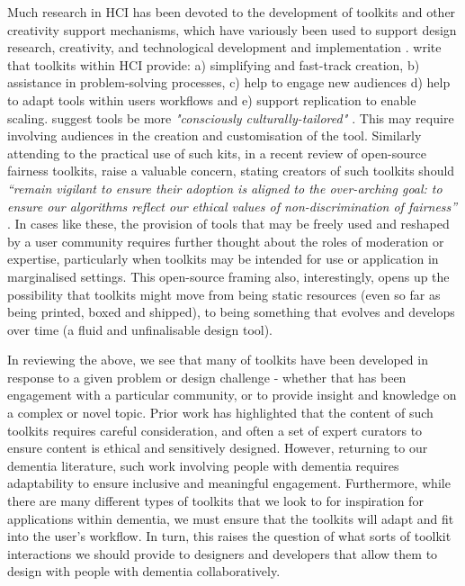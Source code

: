 Much research in HCI has been devoted to the development of toolkits and other creativity support mechanisms, which have variously been used to support design research, creativity, and technological development and implementation \citep{broderick2020theory}. \cite{ledo2018evaluation} write that toolkits within HCI provide: a) simplifying and fast-track creation, b) assistance in problem-solving processes, c) help to engage new audiences d) help to adapt tools within users workflows and e) support replication to enable scaling. \cite{peters2020toolkits} suggest tools be more \textit{"consciously culturally-tailored" \citep[pg.20]{peters2020toolkits}}. This may require involving audiences in the creation and customisation of the tool. Similarly attending to the practical use of such kits, in a recent review of open-source fairness toolkits, \cite{lee2021landscape} raise a valuable concern, stating creators of such toolkits should \textit{“remain vigilant to ensure their adoption is aligned to the over-arching goal: to ensure our algorithms reflect our ethical values of non-discrimination of fairness” \citep[pg.12]{lee2021landscape}}. In cases like these, the provision of tools that may be freely used and reshaped by a user community requires further thought about the roles of moderation or expertise, particularly when toolkits may be intended for use or application in marginalised settings. This open-source framing also, interestingly, opens up the possibility that toolkits might move from being static resources (even so far as being printed, boxed and shipped), to being something that evolves and develops over time (a fluid and unfinalisable design tool).

In reviewing the above, we see that many of toolkits have been developed in response to a given problem or design challenge - whether that has been engagement with a particular community, or to provide insight and knowledge on a complex or novel topic. Prior work has highlighted that the content of such toolkits requires careful consideration, and often a set of expert curators to ensure content is ethical and sensitively designed. However, returning to our dementia literature, such work involving people with dementia requires adaptability to ensure inclusive and meaningful engagement. Furthermore, while there are many different types of toolkits that we look to for inspiration for applications within dementia, we must ensure that the toolkits will adapt and fit into the user’s workflow. In turn, this raises the question of what sorts of toolkit interactions we should provide to designers and developers that allow them to design with people with dementia collaboratively.


